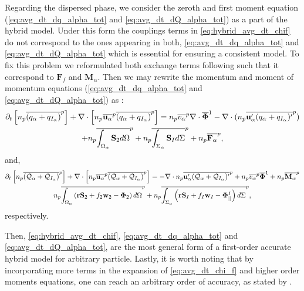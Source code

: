 Regarding the dispersed phase, we consider the zeroth and first moment equation (\ref{eq:avg_dt_dq_alpha_tot} and \ref{eq:avg_dt_dQ_alpha_tot}) as  a part of the hybrid model.
Under this form the couplings terms in \ref{eq:hybrid_avg_dt_chif} do not correspond to the ones appearing in both, \ref{eq:avg_dt_dq_alpha_tot} and \ref{eq:avg_dt_dQ_alpha_tot} which is essential for ensuring a consistent model. 
To fix this problem we reformulated both exchange terms following \citet{zhang1997momentum} such that it correspond to $\mathbf{F}_f$ and $\textbf{M}_\alpha$. 
Then we may rewrite the momentum and moment of momentum equations (\ref{eq:avg_dt_dq_alpha_tot} and \ref{eq:avg_dt_dQ_alpha_tot}) as : 
\begin{multline}
    \partial_t \left[n_p\overline{ (q_\alpha+q_{I_\alpha})}^{p}\right]
    + \mathbf{\nabla} \cdot \left[n_p\overline{\textbf{u}_\alpha}^{p}\overline{(q_\alpha+q_{I_\alpha})}^{p}\right]
    = 
    n_p\overline{v_\alpha}^{p}  \mathbf{\nabla} \cdot\overline{\mathbf{\Phi}}^1
    - \mathbf{\nabla} \cdot (n_p\overline{\textbf{u}_\alpha'(q_\alpha+q_{I_\alpha})'}^{p})\\
    + n_p\overline{\int_{\Omega_\alpha} \textbf{S}_2 d\Omega}^{p}
    + n_p\overline{\int_{\Sigma_\alpha} \textbf{S}_I d\Sigma}^{p}
    + n_p\overline{\textbf{F}_\alpha}^{p},
\end{multline}
and, 
\begin{multline}
    \partial_t \left[n_p\overline{ (\mathcal{Q}_\alpha+\mathcal{Q}_{I_\alpha})}^{p}\right]
    + \mathbf{\nabla} \cdot \left[n_p\overline{\textbf{u}_\alpha}^{p}\overline{(\mathcal{Q}_\alpha+\mathcal{Q}_{I_\alpha})}^{p}\right]
    =
    - \mathbf{\nabla} \cdot n_p\overline{\textbf{u}_\alpha'(\mathcal{Q}_\alpha+\mathcal{Q}_{I_\alpha})'}^{p}
    +n_p\overline{v_\alpha}^{p}\overline{\mathbf{\Phi}}^1
    + n_p\overline{\textbf{M}_\alpha}^{p}\\
    n_p\overline{\int_{\Omega_\alpha} \left(
        \textbf{r} \textbf{S}_2         
        + f_2  \textbf{w}_2 
        - \mathbf{\Phi}_2
        \right) d\Omega}^{p}
        + n_p\overline{\int_{\Sigma_\alpha} \left(
        \textbf{r}\textbf{S}_I
        + f_I \textbf{w}_I
        - \mathbf{\Phi}_{||}^I
    \right) d\Sigma}^{p},
\end{multline}
respectively. 

Then, \ref{eq:hybrid_avg_dt_chif}, \ref{eq:avg_dt_dq_alpha_tot} and \ref{eq:avg_dt_dQ_alpha_tot}, are the most general form of a first-order accurate hybrid model for arbitrary particle. 
Lastly, it is worth noting that by incorporating more terms in the expansion of \ref{eq:avg_dt_chi_f} and higher order moments equations, one can reach an arbitrary order of accuracy, as stated by \citet{zhang1997momentum}. 

